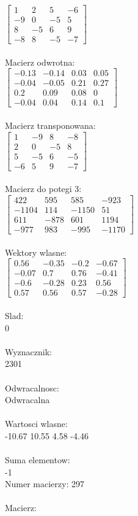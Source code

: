 \documentclass[a4paper,12pt]{article}
\begin{document}
$\begin{bmatrix} 1&2&5&-6\\-9&0&-5&5\\8&-5&6&9\\-8&8&-5&-7 \end{bmatrix}$
\\
\\
Macierz odwrotna:\\

$\begin{bmatrix} -0.13&-0.14&0.03&0.05\\-0.04&-0.05&0.21&0.27\\0.2&0.09&0.08&0\\-0.04&0.04&0.14&0.1 \end{bmatrix}$
\\
\\
Macierz transponowana:\\

$\begin{bmatrix} 1&-9&8&-8\\2&0&-5&8\\5&-5&6&-5\\-6&5&9&-7 \end{bmatrix}$
\\
\\
Macierz do potegi 3:\\

$\begin{bmatrix} 422&595&585&-923\\-1104&114&-1150&51\\611&-878&601&1194\\-977&983&-995&-1170 \end{bmatrix}$
\\
\\
Wektory wlasne:\\

$\begin{bmatrix} 0.56&-0.35&-0.2&-0.67\\-0.07&0.7&0.76&-0.41\\-0.6&-0.28&0.23&0.56\\0.57&0.56&0.57&-0.28 \end{bmatrix}$
\\
\\
Slad:\\
0
\\
\\
Wyznacznik:\\
2301
\\
\\
Odwracalnosc:\\
Odwracalna
\\
\\
Wartosci wlasne:\\
-10.67 10.55 4.58 -4.46
\\
\\
Suma elementow:\\
-1
\\
\newpage
Numer macierzy:
297
\\
\\
Macierz:\\
\end{document}
